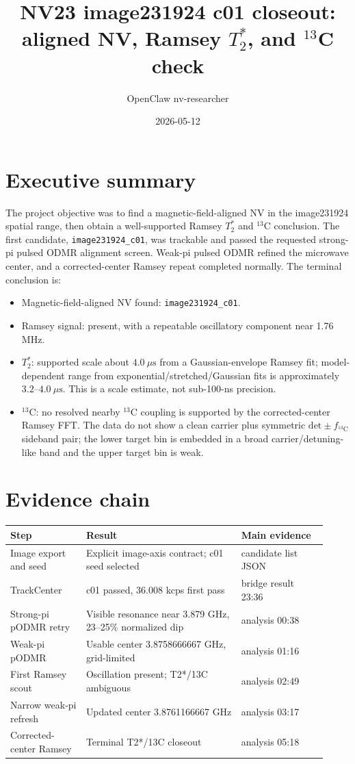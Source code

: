 \documentclass[11pt]{article}
\title{NV23 image231924 c01 closeout: aligned NV, Ramsey $T_2^*$, and $^{13}$C check}
\author{OpenClaw nv-researcher}
\date{2026-05-12}
\begin{document}
\maketitle

\section*{Executive summary}
The project objective was to find a magnetic-field-aligned NV in the image231924
spatial range, then obtain a well-supported Ramsey $T_2^*$ and $^{13}$C conclusion.
The first candidate, \texttt{image231924\_c01}, was trackable and passed the requested
strong-pi pulsed ODMR alignment screen. Weak-pi pulsed ODMR refined the microwave
center, and a corrected-center Ramsey repeat completed normally. The terminal
conclusion is:

\begin{itemize}
\item Magnetic-field-aligned NV found: \texttt{image231924\_c01}.
\item Ramsey signal: present, with a repeatable oscillatory component near 1.76 MHz.
\item $T_2^*$: supported scale about $4.0~\mu\mathrm{s}$ from a Gaussian-envelope Ramsey fit; model-dependent range from exponential/stretched/Gaussian fits is approximately $3.2$--$4.0~\mu\mathrm{s}$. This is a scale estimate, not sub-100-ns precision.
\item $^{13}$C: no resolved nearby $^{13}$C coupling is supported by the corrected-center Ramsey FFT. The data do not show a clean carrier plus symmetric \(\mathrm{det}\pm f_{^{13}\mathrm{C}}\) sideband pair; the lower target bin is embedded in a broad carrier/detuning-like band and the upper target bin is weak.
\end{itemize}

\section*{Evidence chain}
\begin{tabular}{@{}>{\raggedright\arraybackslash}p{0.22\linewidth}>{\raggedright\arraybackslash}p{0.45\linewidth}>{\raggedright\arraybackslash}p{0.25\linewidth}@{}}
\toprule
Step & Result & Main evidence \\
\midrule
Image export and seed & Explicit image-axis contract; c01 seed selected & candidate list JSON \\
TrackCenter & c01 passed, 36.008 kcps first pass & bridge result 23:36 \\
Strong-pi pODMR retry & Visible resonance near 3.879 GHz, 23--25\% normalized dip & analysis 00:38 \\
Weak-pi pODMR & Usable center 3.8758666667 GHz, grid-limited & analysis 01:16 \\
First Ramsey scout & Oscillation present; T2*/13C ambiguous & analysis 02:49 \\
Narrow weak-pi refresh & Updated center 3.8761166667 GHz & analysis 03:17 \\
Corrected-center Ramsey & Terminal T2*/13C closeout & analysis 05:18 \\
\bottomrule
\end{tabular}
\end{document}
